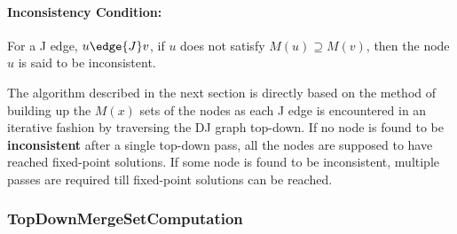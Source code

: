 \paragraph{Inconsistency Condition:}

For a J edge, $u \edge{J} v$, if $u$ does not satisfy
$M(u)\supseteq M(v)$, then the node $u$ is said to be inconsistent. 

The algorithm described in the next section is directly based on the method of building
up the $M(x)$ sets of the nodes as each J edge is encountered in an iterative fashion by
traversing the DJ graph top-down. If no node is found to be {\bf inconsistent} after a single 
top-down pass, all the nodes are supposed to have reached fixed-point solutions. If some node
is found to be inconsistent, multiple passes are required till fixed-point solutions can be
reached.


\subsubsection{TopDownMergeSetComputation}

